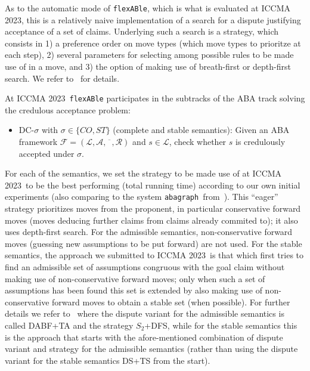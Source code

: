 \documentclass[conference]{IEEEtran}
\newcommand{\flexable}{\texttt{flexABle}\xspace}
\newcommand{\abagraph}{\texttt{abagraph}\xspace}
\newcommand{\iccma}{ICCMA 2023}
\newcommand{\frF}{\ensuremath{\mathcal{F}}\xspace}
\newcommand{\frL}{\ensuremath{\mathcal{L}}\xspace}
\newcommand{\frA}{\ensuremath{\mathcal{A}}\xspace}
\newcommand{\frCtr}{\ensuremath{\overline{\phantom{x}}}\xspace}
\newcommand{\frR}{\ensuremath{\mathcal{R}}\xspace}
\newcommand{\frTup}{\ensuremath{(\frL,\frA,\frCtr,\frR)}\xspace}
\newcommand{\fr}{\ensuremath{\frF = \frTup}\xspace}
\begin{document}
As to the automatic mode of \flexable, which is what is evaluated at \iccma, this is a relatively naive implementation of a search for a dispute justifying acceptance of a set of claims.  Underlying such a search is a strategy, which consists in 1) a preference order on move types (which move types to prioritze at each step), 2) several parameters for selecting among possible rules to be made use of in a move, and 3) the option of making use of breath-first or depth-first search.  We refer to~\cite{DiGaGo22,gor22} for details.

At \iccma~\flexable participates in the subtracks of the ABA track solving the credulous acceptance problem:

\begin{itemize}
\item DC-$\sigma$ with $\sigma \in \{CO, ST\}$ (complete and stable semantics): Given an ABA framework \fr and $s \in \frL$, check whether $s$ is credulously accepted under $\sigma$.
\end{itemize}

\noindent For each of the semantics, we set the strategy to be made use of at \iccma~to be the best performing (total running time) according to our own initial experiments (also comparing to the system \abagraph~from~\cite{CravenT16}).  This ``eager'' strategy prioritizes moves from the proponent, in particular conservative forward moves (moves deducing further claims from claims already commited to); it also uses depth-first search.  For the admissible semantics, non-conservative forward moves (guessing new assumptions to be put forward) are not used. For the stable semantics, the approach we submitted to \iccma~is that which first tries to find an admissible set of assumptions congruous with the goal claim without making use of non-conservative forward moves; only when such a set of assumptions has been found this set is extended by also making use of non-conservative forward moves to obtain a stable set (when possible).  For further details we refer to~\cite{DiGaGo22,gor22} where the dispute variant for the admissible semantics is called DABF+TA and the strategy $S_2$+DFS, while for the stable semantics this is the approach that starts with the afore-mentioned combination of dispute variant and strategy for the admissible semantics (rather than using the dispute variant for the stable semantics DS+TS from the start).          

 









%
%
\end{document}
